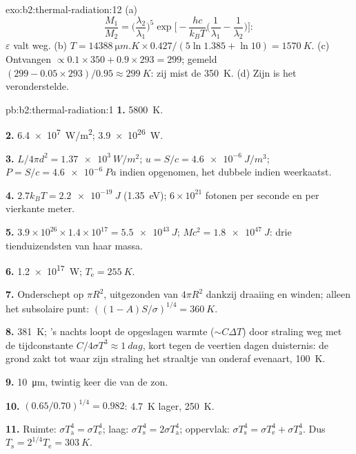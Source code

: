 \begin{solution}{exo:b2:thermal-radiation:12}
(a)
\[
\frac{M_1}{M_2} = \Big(\frac{\lambda_2}{\lambda_1}\Big)^5\exp\Big[-\frac{hc}{k_BT}\Big(\frac{1}{\lambda_1} - \frac{1}{\lambda_2}\Big)\Big] :
\]
$\varepsilon$ valt weg. (b)
$T = \qty{14388}{\micro m.K} \times 0.427/(5\ln 1.385 +
\ln 10) = \qty{1570}{K}$.
(c) Ontvangen $\propto 0.1 \times 350 + 0.9 \times 293 =
299$; gemeld
$(299 - 0.05 \times 293)/0.95 \approx \qty{299}{K}$: zij mist de
\qty{350}{K}. (d) Zijn  is het veronderstelde.
\end{solution}

\begin{solution}{pb:b2:thermal-radiation:1}
\textbf{1.} \qty{5800}{K}.

\textbf{2.} \qty{6.4e7}{W/m^2}; \qty{3.9e26}{W}.

\textbf{3.} $L/4\pi d^2 = \qty{1.37e3}{W/m^2}$; $u = S/c = \qty{4.6e-6}{J/m^3}$;
$P = S/c = \qty{4.6e-6}{Pa}$ indien opgenomen, het dubbele indien weerkaatst.

\textbf{4.} $2.7k_BT = \qty{2.2e-19}{J}$ (\qty{1.35}{eV}); $6 \times 10^{21}$
fotonen per seconde en per vierkante meter.

\textbf{5.}
$3.9 \times 10^{26} \times 1.4 \times 10^{17} = \qty{5.5e43}{J}$;
$Mc^2 =
\qty{1.8e47}{J}$: drie tienduizendsten van haar massa.

\textbf{6.} \qty{1.2e17}{W}; $T_{\text{e}} = \qty{255}{K}$.

\textbf{7.} Onderschept op $\pi R^2$, uitgezonden van $4\pi R^2$ dankzij
draaiing en winden; alleen het subsolaire punt:
$((1 - A)S/\sigma)^{1/4} =
\qty{360}{K}$.

\textbf{8.} \qty{381}{K}; 's nachts loopt de opgeslagen warmte
($\sim C\Delta T$) door
straling weg met de tijdconstante $C/4\sigma T^3 \approx \qty{1}{dag}$, kort
tegen de veertien dagen duisternis: de grond zakt tot waar zijn
straling het straaltje van onderaf evenaart, \qty{100}{K}.

\textbf{9.} \qty{10}{\micro m}, twintig keer die van de zon.

\textbf{10.} $(0.65/0.70)^{1/4} = 0.982$: \qty{4.7}{K} lager, \qty{250}{K}.

\textbf{11.} Ruimte: $\sigma T_{\text{a}}^4 = \sigma T_{\text{e}}^4$; laag:
$\sigma
T_{\text{s}}^4 = 2\sigma T_{\text{a}}^4$; oppervlak:
$\sigma T_{\text{s}}^4 = \sigma
T_{\text{e}}^4 + \sigma T_{\text{a}}^4$. Dus
$T_{\text{s}} = 2^{1/4}T_{\text{e}} = \qty{303}{K}$.


\end{solution}
